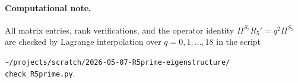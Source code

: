 \documentclass[11pt]{article}
\theoremstyle{definition}
\begin{document}
\paragraph{Computational note.} All matrix entries, rank verifications, and the operator identity $\Pi^{S_5} R_5' = q^2 \Pi^{S_5}$ are checked by Lagrange interpolation over $q = 0, 1, \ldots, 18$ in the script
\begin{center}
\texttt{\textasciitilde/projects/scratch/2026-05-07-R5prime-eigenstructure/}\\
\texttt{check\_R5prime.py}.
\end{center}
\end{document}
